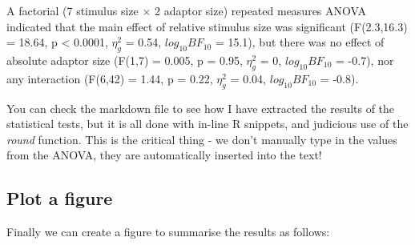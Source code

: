 \documentclass[
]{article}
\begin{document}
A factorial (7 stimulus size \(\times\) 2 adaptor size) repeated measures ANOVA indicated that the main effect of relative stimulus size was significant (F(2.3,16.3) = 18.64, p \textless{} 0.0001, \(\eta^2_g\) = 0.54, \(log_{10}BF_{10}\) = 15.1), but there was no effect of absolute adaptor size (F(1,7) = 0.005, p = 0.95, \(\eta^2_g\) = 0, \(log_{10}BF_{10}\) = -0.7), nor any interaction (F(6,42) = 1.44, p = 0.22, \(\eta^2_g\) = 0.04, \(log_{10}BF_{10}\) = -0.8).

You can check the markdown file to see how I have extracted the results of the statistical tests, but it is all done with in-line R snippets, and judicious use of the \emph{round} function. This is the critical thing - we don't manually type in the values from the ANOVA, they are automatically inserted into the text!

\hypertarget{plot-a-figure}{%
\subsection{Plot a figure}\label{plot-a-figure}}

Finally we can create a figure to summarise the results as follows:
\end{document}
